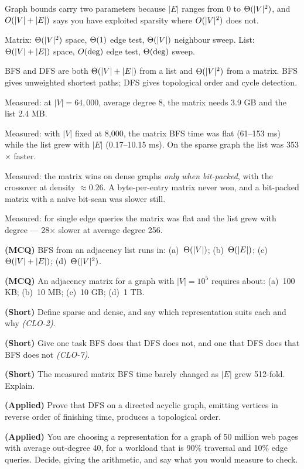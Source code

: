 \begin{chaptersummary}
\begin{tight}
  \item Graph bounds carry two parameters because $|E|$ ranges from $0$ to
        $\Theta(|V|^{2})$, and $O(|V|+|E|)$ says you have exploited
        sparsity where $O(|V|^{2})$ does not.
  \item Matrix: $\Theta(|V|^{2})$ space, $\Theta(1)$ edge test,
        $\Theta(|V|)$ neighbour sweep. List: $\Theta(|V|+|E|)$ space,
        $O(\deg)$ edge test, $\Theta(\deg)$ sweep.
  \item BFS and DFS are both $\Theta(|V|+|E|)$ from a list and
        $\Theta(|V|^{2})$ from a matrix. BFS gives unweighted shortest paths;
        DFS gives topological order and cycle detection.
  \item Measured: at $|V| = 64{,}000$, average degree 8, the matrix needs 3.9
        GB and the list 2.4 MB.
  \item Measured: with $|V|$ fixed at 8{,}000, the matrix BFS time was flat
        (61--153 ms) while the list grew with $|E|$ (0.17--10.15 ms). On the
        sparse graph the list was 353$\times$ faster.
  \item Measured: the matrix wins on dense graphs \emph{only when bit-packed},
        with the crossover at density $\approx 0.26$. A byte-per-entry matrix
        never won, and a bit-packed matrix with a naive bit-scan was slower
        still.
  \item Measured: for single edge queries the matrix was flat and the list grew
        with degree --- 28$\times$ slower at average degree 256.
\end{tight}
\end{chaptersummary}

\begin{reviewq}
  \item \textbf{(MCQ)} BFS from an adjacency list runs in:
        (a)~$\Theta(|V|)$; (b)~$\Theta(|E|)$; (c)~$\Theta(|V|+|E|)$;
        (d)~$\Theta(|V|^{2})$.
  \item \textbf{(MCQ)} An adjacency matrix for a graph with $|V| = 10^{5}$
        requires about: (a)~100 KB; (b)~10 MB; (c)~10 GB; (d)~1 TB.
  \item \textbf{(Short)} Define sparse and dense, and say which representation
        suits each and why \emph{(CLO-2)}.
  \item \textbf{(Short)} Give one task BFS does that DFS does not, and one that
        DFS does that BFS does not \emph{(CLO-7)}.
  \item \textbf{(Short)} The measured matrix BFS time barely changed as $|E|$
        grew 512-fold. Explain.
  \item \textbf{(Applied)} Prove that DFS on a directed acyclic graph, emitting
        vertices in reverse order of finishing time, produces a topological
        order.
  \item \textbf{(Applied)} You are choosing a representation for a graph of
        50 million web pages with average out-degree 40, for a workload that is
        90\% traversal and 10\% edge queries. Decide, giving the arithmetic,
        and say what you would measure to check.
\end{reviewq}
